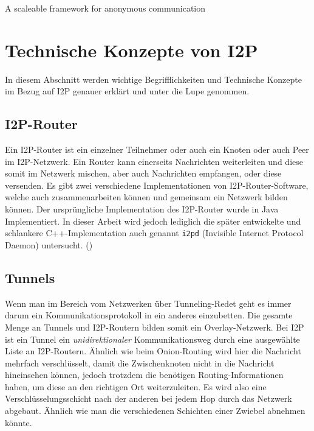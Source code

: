\cite{timpanaro_evaluation_2015}

A scaleable framework for anonymous communication
\cite{noauthor_i2p_nodate-8}


\cite{hoang_measuring_2019}
\cite{hoang_empirical_2018}


\section{Technische Konzepte von I2P}
\label{sec:technischeKonzepte}

In diesem Abschnitt werden wichtige Begrifflichkeiten und Technische Konzepte im Bezug auf I2P genauer erklärt und unter die Lupe genommen.

\subsection{I2P-Router}\label{sec:router}

Ein I2P-Router ist ein einzelner Teilnehmer oder auch ein Knoten oder auch Peer im I2P-Netzwerk.
Ein Router kann einerseits Nachrichten weiterleiten und diese somit im Netzwerk mischen, aber auch Nachrichten empfangen, oder diese versenden.
Es gibt zwei verschiedene Implementationen von I2P-Router-Software, welche auch zusammenarbeiten können und gemeinsam ein Netzwerk bilden können.
Der ursprüngliche Implementation des I2P-Router wurde in Java Implementiert.
In dieser Arbeit wird jedoch lediglich die später entwickelte und schlankere C++-Implementation auch genannt \lstinline|i2pd| (Invisible Internet Protocol Daemon) untersucht. (\cite{noauthor_i})

\subsection{Tunnels}

Wenn man im Bereich vom Netzwerken über Tunneling-Redet geht es immer darum ein Kommunikationsprotokoll in ein anderes einzubetten. \parencite{noauthor_duden_nodate}
Die gesamte Menge an Tunnels und I2P-Routern bilden somit ein Overlay-Netzwerk.
Bei I2P ist ein Tunnel ein \textit{unidirektionaler} Kommunikationsweg durch eine ausgewählte Liste an I2P-Routern.
Ähnlich wie beim Onion-Routing wird hier die Nachricht mehrfach verschlüsselt, damit die Zwischenknoten nicht in die Nachricht hineinsehen können, jedoch trotzdem die benötigen Routing-Informationen haben, um diese an den richtigen Ort weiterzuleiten.
Es wird also eine Verschlüsselungsschicht nach der anderen bei jedem Hop durch das Netzwerk abgebaut.
Ähnlich wie man die verschiedenen Schichten einer Zwiebel abnehmen könnte.
\cite{noauthor_intro_nodate}

